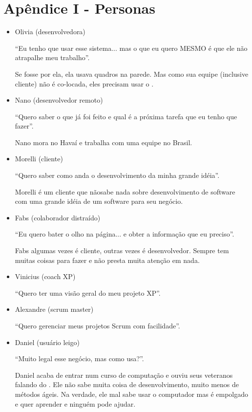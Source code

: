 \section{Apêndice I - Personas}
\begin{itemize}
	\item{Olivia (desenvolvedora)
	
	``Eu tenho que usar esse sistema... mas o que eu quero MESMO é que ele não atrapalhe meu
	trabalho''.
	
	Se fosse por ela, ela usava quadros na parede. Mas como sua equipe (inclusive cliente) não é co-locada, eles
	precisam usar o \calopsita.}
	\item{Nano (desenvolvedor remoto)
	
	``Quero saber o que já foi feito e qual é a próxima tarefa que eu tenho que fazer''.
	
	Nano mora no Havaí e trabalha com uma equipe no Brasil.}
	\item{Morelli (cliente)
	
	``Quero saber como anda o desenvolvimento da minha grande idéia''. 
	
	Morelli é um cliente que nãosabe nada sobre desenvolvimento de software com uma grande idéia de um software para seu negócio.}
	\item{Fabs (colaborador distraído)
	
	``Eu quero bater o olho na página... e obter a informação que eu preciso''.
	
	Fabs algumas vezes é cliente, outras vezes é desenvolvedor. Sempre tem muitas coisas para fazer e não presta muita
	atenção em nada.}
	\item{Vinicius (coach XP)
	
	``Quero ter uma visão geral do meu projeto XP''.}
	\item{Alexandre (scrum master)
	
	``Quero gerenciar meus projetos Scrum com facilidade''.}
	\item{Daniel (usuário leigo)
	
	``Muito legal esse negócio, mas como usa?''. 
	
	Daniel acaba de entrar num curso de computação e ouviu seus veteranos falando do \calopsita. Ele não sabe 
	muita coisa de desenvolvimento, muito menos de métodos ágeis. Na verdade, ele mal sabe usar o computador 
	mas é empolgado e quer aprender e ninguém pode ajudar.}
\end{itemize}